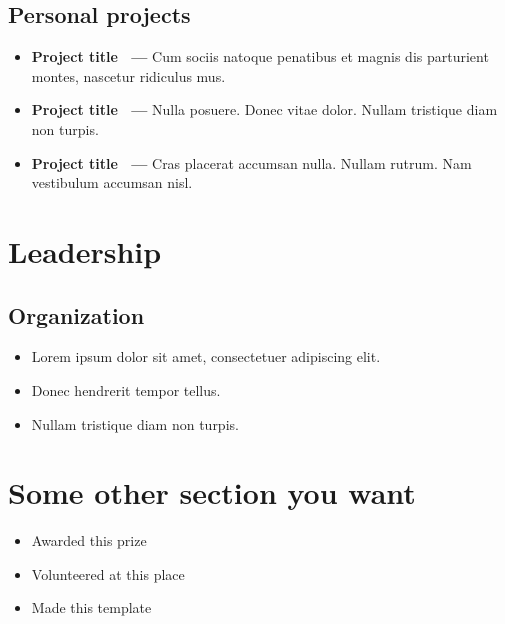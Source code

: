 \documentclass{article}
\begin{document}
	\subsection{Personal projects}
        \vspace{-\baselineskip}  %
	\begin{itemize}
		\item \textbf{Project title~\href{https://github.com/username/repo}{\underline{\faGithub}} --- }
		Cum sociis natoque penatibus et magnis dis parturient montes, nascetur ridiculus mus.

		\item \textbf{Project title~\href{https://github.com/username/repo}{\underline{\faGithub}} --- }
		Nulla posuere.  Donec vitae dolor.  Nullam tristique diam non turpis.

		\item \textbf{Project title~\href{https://github.com/username/repo}{\underline{\faGithub}} --- }
		Cras placerat accumsan nulla.  Nullam rutrum.  Nam vestibulum accumsan nisl.
	\end{itemize}

\section{Leadership}
	\subsection{Organization}
	\begin{itemize}
		\item Lorem ipsum dolor sit amet, consectetuer adipiscing elit.
		\item Donec hendrerit tempor tellus.
		\item Nullam tristique diam non turpis.
	\end{itemize}

\section{Some other section you want}
	\begin{itemize}
		\item Awarded this prize
		\item Volunteered at this place
		\item Made this template
	\end{itemize}
\end{document}

